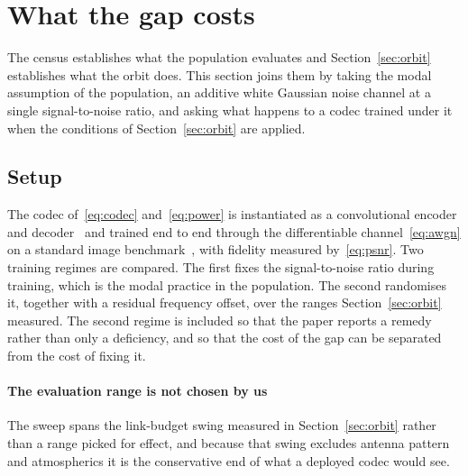 \documentclass[preprint,11pt,3p]{elsarticle}
\begin{document}
\begin{table}[t]
\centering
\caption{The survey's channel-consideration entry against the evaluation sections, for the
\numAgrN{} works where both could be read. ``Named'' counts checklist items the entry mentions,
``In eval.'' counts items the evaluation instantiates.}
\label{tab:agreement}

\end{table}

\section{What the gap costs}
\label{sec:cost}

The census establishes what the population evaluates and Section~\ref{sec:orbit} establishes what
the orbit does. This section joins them by taking the modal assumption of the population, an
additive white Gaussian noise channel at a single signal-to-noise ratio, and asking what happens
to a codec trained under it when the conditions of Section~\ref{sec:orbit} are applied.

\subsection{Setup}

The codec of~\eqref{eq:codec} and~\eqref{eq:power} is instantiated as a convolutional encoder
and decoder~\cite{bourtsoulatze2019deepjscc} and trained end to end through the differentiable
channel~\eqref{eq:awgn} on a standard image benchmark~\cite{krizhevsky2009cifar}, with fidelity
measured by~\eqref{eq:psnr}. Two training regimes are compared. The first
fixes the signal-to-noise ratio during training, which is the modal practice in the population.
The second randomises it, together with a residual frequency offset, over the ranges
Section~\ref{sec:orbit} measured. The second regime is included so that the paper reports a
remedy rather than only a deficiency, and so that the cost of the gap can be separated from the
cost of fixing it.

\paragraph{The evaluation range is not chosen by us}
The sweep spans the link-budget swing measured in Section~\ref{sec:orbit} rather than a range
picked for effect, and because that swing excludes antenna pattern and atmospherics it is the
conservative end of what a deployed codec would see.
\end{document}
